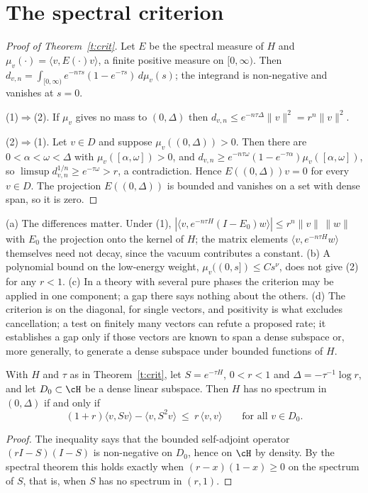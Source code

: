 \section{The spectral criterion}\label{s:crit}
\begin{proof}[Proof of Theorem~\ref{t:crit}]
Let $E$ be the spectral measure of $H$ and $\mu_v(\cdot)=\langle v,E(\cdot)v\rangle$, a finite positive measure
on $[0,\infty)$. Then $d_{v,n}=\int_{[0,\infty)}e^{-n\tau s}(1-e^{-\tau s})\,d\mu_v(s)$; the integrand is
non-negative and vanishes at $s=0$.

(1)$\Rightarrow$(2). If $\mu_v$ gives no mass to $(0,\Delta)$ then $d_{v,n}\le e^{-n\tau\Delta}\|v\|^2=r^n\|v\|^2$.

(2)$\Rightarrow$(1). Let $v\in D$ and suppose $\mu_v((0,\Delta))>0$. Then there are $0<\alpha<\omega<\Delta$ with
$\mu_v([\alpha,\omega])>0$, and $d_{v,n}\ge e^{-n\tau\omega}(1-e^{-\tau\alpha})\mu_v([\alpha,\omega])$, so
$\limsup d_{v,n}^{1/n}\ge e^{-\tau\omega}>r$, a contradiction. Hence $E((0,\Delta))v=0$ for every $v\in D$.
The projection $E((0,\Delta))$ is bounded and vanishes on a set with dense span, so it is zero.
\end{proof}

\begin{remark}\label{r:crit}
(a) The differences matter. Under (1), $|\langle v,e^{-n\tau H}(I-E_0)w\rangle|\le r^n\|v\|\,\|w\|$ with $E_0$ the
projection onto the kernel of $H$; the matrix elements $\langle v,e^{-n\tau H}w\rangle$ themselves need not decay,
since the vacuum contributes a constant. (b) A polynomial bound on the low-energy weight,
$\mu_v((0,s])\le Cs^\nu$, does not give (2) for any $r<1$. (c) In a theory with several pure phases the criterion
may be applied in one component; a gap there says nothing about the others. (d) The criterion is on the
diagonal, for single vectors, and positivity is what excludes cancellation; a test on finitely many vectors
can refute a proposed rate; it establishes a gap only if those vectors are known to span a dense subspace or, more generally, to
generate a dense subspace under bounded functions of $H$.
\end{remark}

\begin{proposition}\label{p:three}
With $H$ and $\tau$ as in Theorem~\ref{t:crit}, let $S=e^{-\tau H}$, $0<r<1$ and $\Delta=-\tau^{-1}\log r$, and let
$D_0\subset\cH$ be a dense linear subspace. Then $H$ has no spectrum in $(0,\Delta)$ if and only if
\[
(1+r)\langle v,Sv\rangle-\langle v,S^2v\rangle\ \le\ r\,\langle v,v\rangle\qquad\text{for all }v\in D_0 .
\]
\end{proposition}
\begin{proof}
The inequality says that the bounded self-adjoint operator $(rI-S)(I-S)$ is non-negative on $D_0$, hence on
$\cH$ by density. By the spectral theorem this holds exactly when $(r-x)(1-x)\ge0$ on the spectrum of $S$,
that is, when $S$ has no spectrum in $(r,1)$.
\end{proof}

